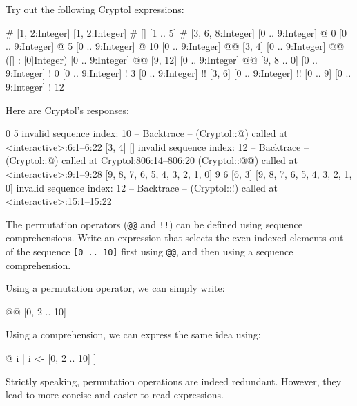 
\restartrepl
\begin{Exercise}\label{ex:seq:7}
Try out the following Cryptol expressions:
\begin{replinVerb}
  [] # [1, 2:Integer]
  [1, 2:Integer] # []
  [1 .. 5] # [3, 6, 8:Integer]
  [0 .. 9:Integer] @ 0
  [0 .. 9:Integer] @ 5
  [0 .. 9:Integer] @ 10
  [0 .. 9:Integer] @@ [3, 4]
  [0 .. 9:Integer] @@ ([] : [0]Integer)
  [0 .. 9:Integer] @@ [9, 12]
  [0 .. 9:Integer] @@ [9, 8 .. 0]
  [0 .. 9:Integer] ! 0
  [0 .. 9:Integer] ! 3
  [0 .. 9:Integer] !! [3, 6]
  [0 .. 9:Integer] !! [0 .. 9]
  [0 .. 9:Integer] ! 12
\end{replinVerb}
\end{Exercise}
\begin{Answer}
Here are Cryptol's responses:
\begin{reploutVerb}
  [1, 2]
  [1, 2]
  [1, 2, 3, 4, 5, 3, 6, 8]
  0
  5
  invalid sequence index: 10
  -- Backtrace --
  (Cryptol::@) called at <interactive>:6:1--6:22
  [3, 4]
  []
  invalid sequence index: 12
   -- Backtrace --
  (Cryptol::@) called at Cryptol:806:14--806:20
  (Cryptol::@@) called at <interactive>:9:1--9:28
  [9, 8, 7, 6, 5, 4, 3, 2, 1, 0]
  9
  6
  [6, 3]
  [9, 8, 7, 6, 5, 4, 3, 2, 1, 0]
  invalid sequence index: 12
  -- Backtrace --
  (Cryptol::!) called at <interactive>:15:1--15:22
\end{reploutVerb}
\end{Answer}

\restartrepl
\begin{Exercise}\label{ex:seq:8}
  The permutation operators ({\tt @@} and {\tt !!}) can be defined
  using sequence comprehensions.  Write an expression that selects the
  even indexed elements out of the sequence \texttt{[0 ..\ 10]} first
  using {\tt @@}, and then using a sequence comprehension.
\end{Exercise}
\begin{Answer}
Using a permutation operator, we can simply write:
\begin{replinVerb}
  [0 .. 10] @@ [0, 2 .. 10]
\end{replinVerb}
Using a comprehension, we can express the same idea using:
\begin{replinVerb}
  [ [0 .. 10] @ i | i <- [0, 2 .. 10] ]
\end{replinVerb}
Strictly speaking, permutation operations are indeed redundant.
However, they lead to more concise and easier-to-read expressions.
\end{Answer}

